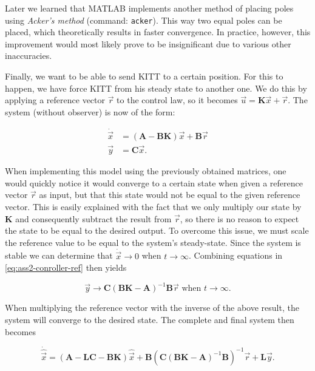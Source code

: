 \documentclass[11pt,titlepage]{report}
\begin{document}
Later we learned that MATLAB implements another method of placing poles using \textit{Acker's method} (command: \texttt{acker}). This way two equal poles can be placed, which theoretically results in faster convergence. In practice, however, this improvement would most likely prove to be insignificant due to various other inaccuracies.

Finally, we want to be able to send KITT to a certain position. For this to happen, we have force KITT from his steady state to another one. We do this by applying a reference vector $\vec{r}$ to the control law, so it becomes $\vec{u} = \mathbf{K}\vec{x} + \vec{r}$. The system (without observer) is now of the form:

\begin{align}
	\dot{\vec{x}} &= (\mathbf{A}-\mathbf{B}\mathbf{K})\vec{x} + \mathbf{B}\vec{r} \\
	\vec{y} &= \mathbf{C}\vec{x}.
	\label{eq:ass2-conroller-ref}
\end{align}

When implementing this model using the previously obtained matrices, one would quickly notice it would converge to a certain state when given a reference vector $\vec{r}$ as input, but that this state would not be equal to the given reference vector. This is easily explained with the fact that we only multiply our state by $\mathbf{K}$ and consequently subtract the result from $\vec{r}$, so there is no reason to expect the state to be equal to the desired output. To overcome this issue, we must scale the reference value to be equal to the system's steady-state. Since the system is stable we can determine that $\dot{\vec{x}} \to 0$ when $t \to \infty$. Combining equations in \ref{eq:ass2-conroller-ref} then yields

\begin{equation}
	\vec{y} \to \mathbf{C} (\mathbf{B} \mathbf{K} - \mathbf{A})^{-1} \mathbf{B} \vec{r} \text{ when } t \to \infty.
\end{equation}

When multiplying the reference vector with the inverse of the above result, the system will converge to the desired state. The complete and final system then becomes

\begin{equation}
	\dot{\hat{\vec{x}}} = (\mathbf{A}-\mathbf{L}\mathbf{C}-\mathbf{B}\mathbf{K}) \hat{\vec{x}} + \mathbf{B}(\mathbf{C}(\mathbf{B} \mathbf{K} - \mathbf{A})^{-1} \mathbf{B})^{-1} \vec{r} + \mathbf{L} \vec{y}.
\end{equation}
\end{document}
